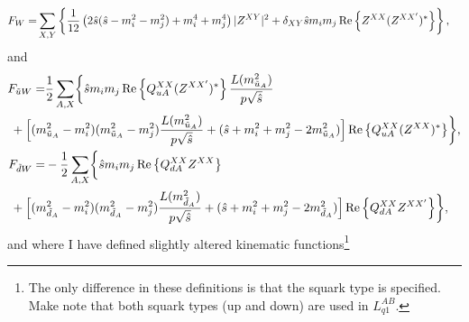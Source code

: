 \documentclass[../main.tex]{subfiles}
\begin{document}
\begin{align}
  F_{W} = & \sum_{X,Y} \left\{\frac{1}{12} \left(2\hat{s}(\hat{s}-m_i^2-m_j^2) + m_i^4 + m_j^4\right) |Z^{XY}|^2 + \delta_{XY} \hat{s}m_i m_j \operatorname{Re}\left\{Z^{XX} (Z^{XX^\prime})^\ast\right\}\right\},
\end{align}
and
\\
\begin{subequations}
  \begin{align}
    \nonumber
    F_{\tilde{u}W} = & \frac{1}{2} \sum_{A,X} \biggl\{
    \hat{s} m_i m_j \Re{Q_{uA}^{XX} (Z^{XX^\prime})^\ast}\frac{L(m_{\tilde{u}_A}^2)}{p \sqrt{\hat{s}}}                                                                                                                              \\
                     & \hspace{-1cm}+ \Bigl[(m_{\tilde{u}_A}^2-m_i^2)(m_{\tilde{u}_A}^2-m_j^2) \frac{L(m_{\tilde{u}_A}^2)}{p \sqrt{\hat{s}}} + (\hat{s} + m_i^2 + m_j^2 - 2m_{\tilde{u}_A}^2)\Bigr] \Re{Q_{uA}^{XX}(Z^{XX})^\ast}
    \biggr\},                                                                                                                                                                                                                       \\
    \nonumber
    F_{\tilde{d}W} = & -\frac{1}{2} \sum_{A,X} \biggl\{
    \hat{s} m_i m_j \Re{Q_{dA}^{XX} Z^{XX}}                                                                                                                                                                                         \\
                     & \hspace{-1cm} + \Bigl[(m_{\tilde{d}_A}^2-m_i^2)(m_{\tilde{d}_A}^2-m_j^2) \frac{L(m_{\tilde{d}_A}^2)}{p \sqrt{\hat{s}}} + (\hat{s} + m_i^2 + m_j^2 - 2m_{\tilde{d}_A}^2) \Bigr]\Re{Q_{dA}^{XX} Z^{XX^\prime}}
    \biggr\},
  \end{align}
\end{subequations}
and where I have defined slightly altered kinematic functions\footnote{The only difference in these definitions is that the squark type is specified. Make note that both squark types (up and down) are used in \(L_{q1}^{AB}\).}
\end{document}
